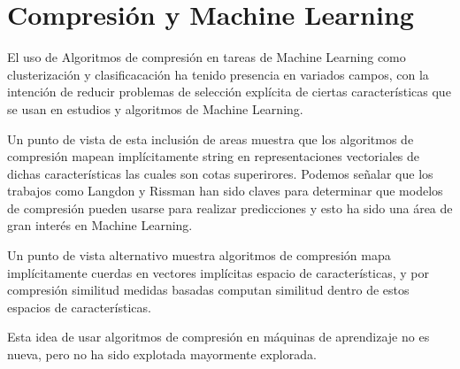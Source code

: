 
\chapter[Compresión y Machine Learning]{Compresión y Machine Learning}
\label{ch:Compresion-Machine-Learning}








El uso de Algoritmos de compresión en tareas de Machine Learning como clusterización y clasificacación ha tenido presencia en variados campos, con la intención de reducir problemas de selección explícita de ciertas características que se usan en estudios y algoritmos de Machine Learning.

Un punto de vista de esta inclusión de areas muestra que los algoritmos de compresión mapean implícitamente string en representaciones vectoriales de dichas características las cuales son cotas superirores. Podemos señalar que los trabajos como Langdon y Rissman han sido claves para determinar que modelos de compresión pueden usarse para realizar predicciones y esto ha sido una área de gran interés en Machine Learning.

Un punto de vista alternativo muestra algoritmos de compresión mapa implícitamente cuerdas en vectores implícitas espacio de características, y por compresión similitud medidas basadas computan similitud dentro de estos espacios de características. 

Esta idea de usar algoritmos de compresión en máquinas de aprendizaje no es nueva, pero no ha sido explotada mayormente explorada.





